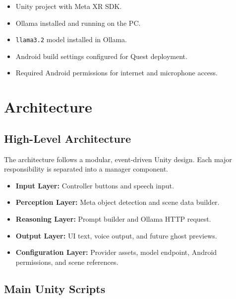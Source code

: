 \documentclass[12pt,a4paper]{article}
\begin{document}
\begin{itemize}
    \item Unity project with Meta XR SDK.
    \item Ollama installed and running on the PC.
    \item \texttt{llama3.2} model installed in Ollama.
    \item Android build settings configured for Quest deployment.
    \item Required Android permissions for internet and microphone access.
\end{itemize}

\section{Architecture}

\subsection{High-Level Architecture}

The architecture follows a modular, event-driven Unity design. Each major responsibility is separated into a manager component.

\begin{itemize}
    \item \textbf{Input Layer:} Controller buttons and speech input.
    \item \textbf{Perception Layer:} Meta object detection and scene data builder.
    \item \textbf{Reasoning Layer:} Prompt builder and Ollama HTTP request.
    \item \textbf{Output Layer:} UI text, voice output, and future ghost previews.
    \item \textbf{Configuration Layer:} Provider assets, model endpoint, Android permissions, and scene references.
\end{itemize}

\subsection{Main Unity Scripts}
\end{document}
